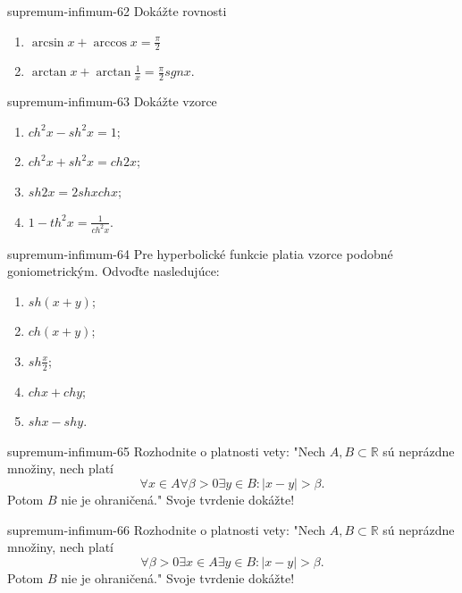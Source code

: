 \begin{defproblem}{supremum-infimum-62}
Dokážte rovnosti
\begin{enumerate}
\item $\arcsin x +\arccos x =\frac{\pi}{2}$
\item $\arctan x +\arctan\frac{1}{x}=\frac{\pi}{2}sgn x$.
\end{enumerate}
\end{defproblem}

\begin{defproblem}{supremum-infimum-63}
Dokážte vzorce
\begin{multicols}{2}
\begin{enumerate}
    \item $ch^2x-sh^2x=1$;
    \item $ch^2x+sh^2x=ch 2x$;
    \item $sh 2x =2sh x ch x$;
    \item $1-th^2x=\frac{1}{ch^2x}$.
\end{enumerate}
\end{multicols}
\end{defproblem}

\begin{defproblem}{supremum-infimum-64}
Pre hyperbolické funkcie platia vzorce podobné goniometrickým. Odvoďte nasledujúce:
\begin{multicols}{2}
\begin{enumerate}
    \item $sh(x+y)$;
    \item $ch(x+y)$;
    \item $sh\frac{x}{2}$;
    \item $ch x + ch y$;
    \item $sh x - sh y$.
\end{enumerate}
\end{multicols}
\end{defproblem}

\begin{defproblem}{supremum-infimum-65}
Rozhodnite o platnosti vety: "Nech $A,B\subset\mathbb{R}$ sú neprázdne množiny, nech platí $$\forall x\in A \forall \beta >0 \exists y\in B: |x-y|>\beta.$$ Potom $B$ nie je ohraničená." Svoje tvrdenie dokážte!
\end{defproblem}

\begin{defproblem}{supremum-infimum-66}
Rozhodnite o platnosti vety: "Nech $A,B\subset\mathbb{R}$ sú neprázdne množiny, nech platí $$\forall \beta >0 \exists x\in A \exists y\in B: |x-y|>\beta.$$ Potom $B$ nie je ohraničená." Svoje tvrdenie dokážte!
\end{defproblem}

